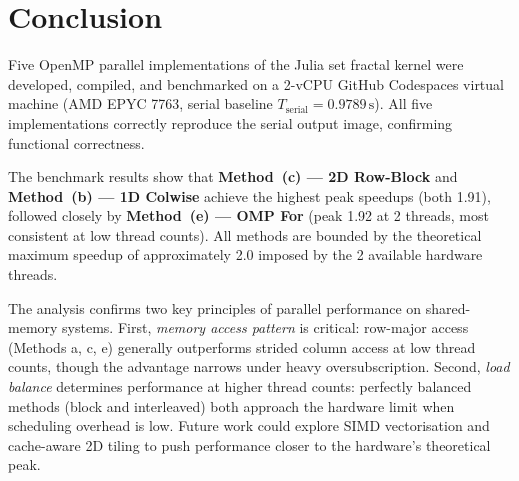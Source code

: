 \section{Conclusion}

Five OpenMP parallel implementations of the Julia set fractal kernel were developed,
compiled, and benchmarked on a 2-vCPU GitHub Codespaces virtual machine
(AMD EPYC 7763, serial baseline $T_{\text{serial}} = 0.9789\,\text{s}$).
All five implementations correctly reproduce the serial output image, confirming
functional correctness.

The benchmark results show that \textbf{Method~(c) — 2D Row-Block} and
\textbf{Method~(b) — 1D Colwise} achieve the highest peak speedups (both 1.91),
followed closely by \textbf{Method~(e) — OMP For} (peak 1.92 at 2 threads, most
consistent at low thread counts).
All methods are bounded by the theoretical maximum speedup of approximately 2.0
imposed by the 2 available hardware threads.

The analysis confirms two key principles of parallel performance on shared-memory
systems.
First, \emph{memory access pattern} is critical: row-major access (Methods a, c, e)
generally outperforms strided column access at low thread counts, though the advantage
narrows under heavy oversubscription.
Second, \emph{load balance} determines performance at higher thread counts: perfectly
balanced methods (block and interleaved) both approach the hardware limit when
scheduling overhead is low.
Future work could explore SIMD vectorisation and cache-aware 2D tiling to push
performance closer to the hardware's theoretical peak.





